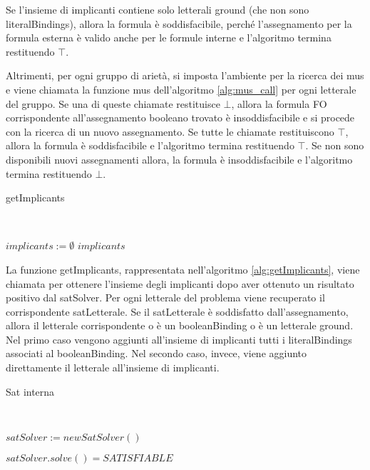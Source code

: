 \documentclass[./main.tex]{subfiles}
\begin{document}
Se l'insieme di implicanti contiene solo letterali ground (che non sono literalBindings), allora la formula è soddisfacibile, 
perché l'assegnamento per la formula esterna è valido anche per le formule interne e l'algoritmo termina restituendo $\top$.

Altrimenti, per ogni gruppo di arietà, si imposta l'ambiente per la ricerca dei mus
e viene chiamata la funzione mus dell'algoritmo \ref{alg:mus_call} per ogni letterale del gruppo.
Se una di queste chiamate restituisce $\bot$, allora la formula FO corrispondente 
all'assegnamento booleano trovato è insoddisfacibile e si procede con la ricerca di un nuovo assegnamento.
Se tutte le chiamate restituiscono $\top$, allora la formula è soddisfacibile e l'algoritmo termina restituendo $\top$.
Se non sono disponibili nuovi assegnamenti allora, la formula è insoddisfacibile e l'algoritmo termina restituendo $\bot$.

\begin{algorithm}[H] \label{alg:getImplicants}
    \caption{getImplicants}
    \\

$implicants := \emptyset$\;
\Return $implicants$\;
\end{algorithm}

La funzione getImplicants, rappresentata nell'algoritmo \ref{alg:getImplicants}, viene chiamata per ottenere l'insieme degli implicanti
dopo aver ottenuto un risultato positivo dal satSolver.
Per ogni letterale del problema viene recuperato il corrispondente satLetterale.
Se il satLetterale è soddisfatto dall'assegnamento, allora il letterale corrispondente o è un booleanBinding o è un letterale ground.
Nel primo caso vengono aggiunti all'insieme di implicanti tutti i literalBindings associati al booleanBinding.
Nel secondo caso, invece, viene aggiunto direttamente il letterale all'insieme di implicanti.

\begin{algorithm}[H] \label{alg:internalSat}
    \caption{Sat interna}
    \\

$satSolver := newSatSolver()$\;

\Return $satSolver.solve() = SATISFIABLE$\;
\end{algorithm}
\end{document}
